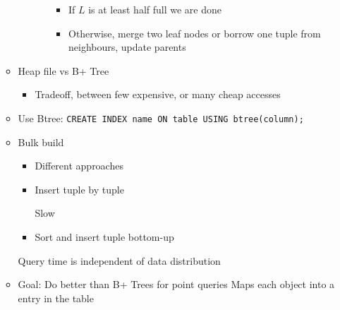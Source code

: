 \begin{itemize}
\begin{itemize}
\begin{itemize}
\begin{itemize}
\begin{itemize}
                                    \item If $L$ is at least half full we are done
                                    \item Otherwise, merge two leaf nodes or borrow one tuple from neighbours, update parents
                                \end{itemize}
                        \end{itemize}
                \end{itemize}
            \item Heap file vs B+ Tree
                \begin{itemize}
                        \begin{itemize}
                            \ipro Lot of sequential scans
                        \end{itemize}
                        \begin{itemize}
                            \ipro Small number of random access
                        \end{itemize}
                    \item Tradeoff, between few expensive, or many cheap accesses
                \end{itemize}
            \item Use Btree: \verb+CREATE INDEX name ON table USING btree(column);+
            \item Bulk build
                \begin{itemize}
                    \item Different approaches
                    \item Insert tuple by tuple
                        \begin{itemize}
                            \icon Slow
                        \end{itemize}
                    \item Sort and insert tuple bottom-up
                \end{itemize}
            \ipro Query time is independent of data distribution
        \end{itemize}
        \begin{itemize}
            \item Goal: Do better than B+ Trees for point queries
             Maps each object into a entry in the table
                \begin{itemize}

\end{itemize}
\end{itemize}
\end{itemize}
